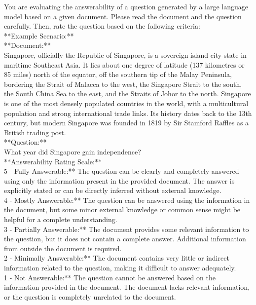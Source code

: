 
\begin{tcolorbox}[
    enhanced,
    colback=white, %
    colframe=black, %
    arc=5mm, %
    boxrule=1pt,
    left=2mm, %
    right=2mm, %
    top=1mm, %
    bottom=1mm %
]

You are evaluating the answerability of a question generated by a large language model based on a given document. Please read the document and the question carefully. Then, rate the question based on the following criteria:\\

**Example Scenario:**\\

**Document:**\\
Singapore, officially the Republic of Singapore, is a sovereign island city-state in maritime Southeast Asia. It lies about one degree of latitude (137 kilometres or 85 miles) north of the equator, off the southern tip of the Malay Peninsula, bordering the Strait of Malacca to the west, the Singapore Strait to the south, the South China Sea to the east, and the Straits of Johor to the north. Singapore is one of the most densely populated countries in the world, with a multicultural population and strong international trade links. Its history dates back to the 13th century, but modern Singapore was founded in 1819 by Sir Stamford Raffles as a British trading post.\\

**Question:**\\
What year did Singapore gain independence?\\

**Answerability Rating Scale:**\\

5 - Fully Answerable:** The question can be clearly and completely answered using only the information present in the provided document. The answer is explicitly stated or can be directly inferred without external knowledge.\\
4 - Mostly Answerable:** The question can be answered using the information in the document, but some minor external knowledge or common sense might be helpful for a complete understanding.\\
3 - Partially Answerable:** The document provides some relevant information to the question, but it does not contain a complete answer. Additional information from outside the document is required.\\
2 - Minimally Answerable:** The document contains very little or indirect information related to the question, making it difficult to answer adequately.\\
1 - Not Answerable:** The question cannot be answered based on the information provided in the document. The document lacks relevant information, or the question is completely unrelated to the document.\\




\end{tcolorbox}
